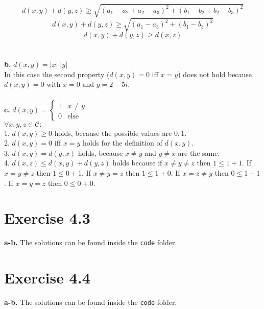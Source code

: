 \documentclass[12pt]{article}
\begin{document}
	$$d(x,y) + d(y,z) \geq \sqrt{(a_1 - a_2 + a_2 - a_3)^2 + (b_1 - b_2 + b_2 - b_3)^2}  $$
	$$d(x,y) + d(y,z) \geq \sqrt{(a_1 - a_3)^2 + (b_1 - b_3)^2}  $$
	$$d(x,y) + d(y,z)  \geq d(x,z)$$\\\\
	\textbf{b.} $d(x,y) = \vert x \vert \cdot \vert y \vert$\\
	In this case the second property ($d(x, y) = 0 \text{ iff } x = y$) does not hold because $d(x,y) = 0 \text{ with } x = 0 \text{ and } y = 2 - 5i$.\\\\
	\textbf{c.} $d(x,y) = \begin{cases} 1 & x \neq y\\ 0 & \mbox{else} \end{cases}$\\
	$\forall x, y, z \in \mathcal{C}:$\\
	1. $d(x,y) \geq 0$ holds, because the possible values are $0,1$.\\
	2. $d(x, y) = 0 \text{ iff } x = y$ holds for the definition of $d(x,y)$.\\
	3. $d(x, y) = d(y,x)$ holds, because $x \neq y$ and $y \neq x$ are the same.\\
	4. $d(x, z) \leq d(x, y) + d(y, z)$ holds because if $ x \neq y \neq z$ then $1 \leq 1 + 1$. If $x = y \neq z$ then $1 \leq 0 + 1$. If $x \neq y = z$ then $1 \leq 1 + 0$. If $x = z \neq y$ then $0 \leq 1 + 1$. If $x = y = z$ then $0 \leq 0 + 0$.
	
	\section*{Exercise 4.3}
	\textbf{a-b.} The solutions can be found inside the \texttt{code} folder.
	\section*{Exercise 4.4}
	\textbf{a-b.} The solutions can be found inside the \texttt{code} folder.
\end{document}
